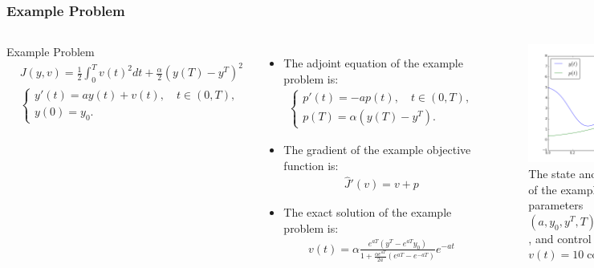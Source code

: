 \documentclass[9pt]{beamer}
\begin{document}
\begin{frame}
\frametitle{Example Problem}
\begin{columns}
\begin{block}{Example Problem}
\begin{align*}
&J(y,v) = \frac{1}{2}\int_0^Tv(t)^2dt + \frac{\alpha}{2}(y(T)-y^T)^2 \\
&\left\{
     \begin{array}{lr}
       	y'(t)=ay(t) + v(t), \quad  t\in(0,T),\\
       	y(0)=y_0.
     \end{array}
   \right. 
\end{align*}
\end{block}
\begin{itemize}
\item{{\small The adjoint equation of the example problem is:}
{\small
\begin{align*}
\left\{
     \begin{array}{lr}
       	p'(t)=-ap(t), \quad  t\in(0,T),\\
       	p(T)=\alpha(y(T)-y^T).
     \end{array}
   \right. 
\end{align*}
}}
\item{{\small The gradient of the example objective function is:}{\small
\begin{align*}
\hat{J}'(v) = v+p
\end{align*}
}}
\item{{\small The exact solution of the example problem is:}
{\small 
\begin{align*}
v(t) = \alpha\frac{e^{aT}(y^T-e^{aT}y_0)}{1+\frac{\alpha e^{aT}}{2a}(e^{aT}-e^{-aT})}e^{-at}
\end{align*}}}
\end{itemize}
\begin{figure}
\includegraphics[scale=0.24]{ype.png}
\caption{{\tiny The state and adjoint equation of the example problem with parameters $(a,y_0,y^T,T)=(-3,5,-7,1)$, and control variable $v(t)=10\cos(5\pi t)$.}}
\end{figure}
\end{columns}
\end{frame}
\end{document}
